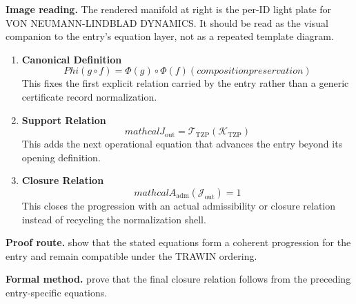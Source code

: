 \begin{samepage}
\noindent\begin{minipage}[t]{0.45\linewidth}
\vspace{0pt}
\raggedright
\scriptsize\textbf{Image reading.} The rendered manifold at right is the per-ID light plate for VON NEUMANN-LINDBLAD DYNAMICS. It should be read as the visual companion to the entry's equation layer, not as a repeated template diagram.\par
\end{minipage}\hfill
\begin{minipage}[t]{0.53\linewidth}
\vspace*{-0.10in}
\raggedright
{}
\end{minipage}
\end{samepage}

\clearpage


\begin{enumerate}[leftmargin=1.6em,itemsep=9pt,topsep=6pt]
\item \textbf{Canonical Definition}
\[
Phi(g ∘ f) = \Phi(g) ∘ \Phi(f) (composition preservation)
\]
This fixes the first explicit relation carried by the entry rather than a generic certificate record normalization.

\item \textbf{Support Relation}
\[
mathcal{J}_{\mathrm{out}} = \mathcal{T}_{\mathrm{TZP}}\!\left(\mathcal{K}_{\mathrm{TZP}}\right)
\]
This adds the next operational equation that advances the entry beyond its opening definition.

\item \textbf{Closure Relation}
\[
mathcal{A}_{\mathrm{adm}}\!\left(\mathcal{J}_{\mathrm{out}}\right)=1
\]
This closes the progression with an actual admissibility or closure relation instead of recycling the normalization shell.
\end{enumerate}

\textbf{Proof route.} show that the stated equations form a coherent progression for the entry and remain compatible under the TRAWIN ordering.

\textbf{Formal method.} prove that the final closure relation follows from the preceding entry-specific equations.

\medskip
{}

